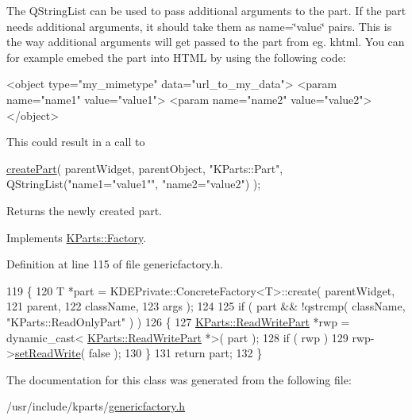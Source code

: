The Q\+String\+List can be used to pass additional arguments to the part. If the part needs additional arguments, it should take them as name=\char`\"{}value\char`\"{} pairs. This is the way additional arguments will get passed to the part from eg. khtml. You can for example emebed the part into H\+T\+M\+L by using the following code\+: 
\begin{DoxyCode}
<\textcolor{keywordtype}{object} type=\textcolor{stringliteral}{"my\_mimetype"} data=\textcolor{stringliteral}{"url\_to\_my\_data"}>
    <param name=\textcolor{stringliteral}{"name1"} value=\textcolor{stringliteral}{"value1"}>
    <param name=\textcolor{stringliteral}{"name2"} value=\textcolor{stringliteral}{"value2"}>
</\textcolor{keywordtype}{object}>
\end{DoxyCode}
 This could result in a call to 
\begin{DoxyCode}
\hyperlink{classKParts_1_1Factory_a41e7c93ddb621d17b7f380a9455ba2a8}{createPart}( parentWidget, parentObject, \textcolor{stringliteral}{"KParts::Part"},
            QStringList(\textcolor{stringliteral}{"name1="}value1\textcolor{stringliteral}{""}, \textcolor{stringliteral}{"name2="}value2\textcolor{stringliteral}{") );}
\end{DoxyCode}


\begin{DoxyReturn}{Returns}
the newly created part. 
\end{DoxyReturn}


Implements \hyperlink{classKParts_1_1Factory_a05e336b747b65776e31db466736570f2}{K\+Parts\+::\+Factory}.



Definition at line 115 of file genericfactory.\+h.


\begin{DoxyCode}
119         \{
120             T *part = KDEPrivate::ConcreteFactory<T>::create( parentWidget,
121                                                               parent,
122                                                               className,
123                                                               args );
124 
125             \textcolor{keywordflow}{if} ( part && !qstrcmp( className, \textcolor{stringliteral}{"KParts::ReadOnlyPart"} ) )
126             \{
127                 \hyperlink{classKParts_1_1ReadWritePart}{KParts::ReadWritePart} *rwp = \textcolor{keyword}{dynamic\_cast<}
      \hyperlink{classKParts_1_1ReadWritePart}{KParts::ReadWritePart} *\textcolor{keyword}{>}( part );
128                 \textcolor{keywordflow}{if} ( rwp )
129                     rwp->\hyperlink{classKParts_1_1ReadWritePart_a5b8c2d4b35739c882dc67f0acf8096c2}{setReadWrite}( \textcolor{keyword}{false} );
130             \}
131             \textcolor{keywordflow}{return} part;
132         \}
\end{DoxyCode}


The documentation for this class was generated from the following file\+:\begin{DoxyCompactItemize}
\item 
/usr/include/kparts/\hyperlink{genericfactory_8h}{genericfactory.\+h}\end{DoxyCompactItemize}
